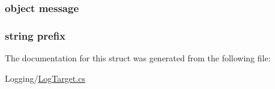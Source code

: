 \subsubsection[{message}]{\setlength{\rightskip}{0pt plus 5cm}object message}\label{structOTA_1_1Logging_1_1OutputEntry_aaccbdd0ebbc076a6e743906a1d34a9c3}
\hypertarget{structOTA_1_1Logging_1_1OutputEntry_ab7b6fb49a3a178b1628690ad0f00927d}{}
\subsubsection[{prefix}]{\setlength{\rightskip}{0pt plus 5cm}string prefix}\label{structOTA_1_1Logging_1_1OutputEntry_ab7b6fb49a3a178b1628690ad0f00927d}


The documentation for this struct was generated from the following file\+:\begin{DoxyCompactItemize}
\item 
Logging/\hyperlink{LogTarget_8cs}{Log\+Target.\+cs}\end{DoxyCompactItemize}
